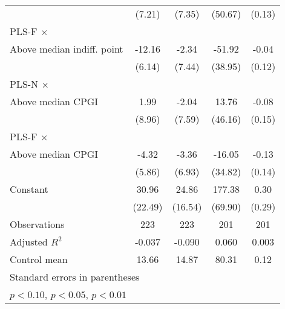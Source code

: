 \begin{table}[htbp]
\begin{tabular}{l*{4}{c}}
                &   (7.21)         &   (7.35)         &  (50.67)         &   (0.13)         \\
\addlinespace
PLS-F $\times$ \\ Above median indiff. point&   -12.16\sym{**} &    -2.34         &   -51.92         &    -0.04         \\
                &   (6.14)         &   (7.44)         &  (38.95)         &   (0.12)         \\
\addlinespace
PLS-N $\times$ \\ Above median CPGI&     1.99         &    -2.04         &    13.76         &    -0.08         \\
                &   (8.96)         &   (7.59)         &  (46.16)         &   (0.15)         \\
\addlinespace
PLS-F $\times$ \\ Above median CPGI&    -4.32         &    -3.36         &   -16.05         &    -0.13         \\
                &   (5.86)         &   (6.93)         &  (34.82)         &   (0.14)         \\
\addlinespace
Constant        &    30.96         &    24.86         &   177.38\sym{**} &     0.30         \\
                &  (22.49)         &  (16.54)         &  (69.90)         &   (0.29)         \\
\midrule
Observations    &      223         &      223         &      201         &      201         \\
Adjusted \(R^{2}\)&   -0.037         &   -0.090         &    0.060         &    0.003         \\
Control mean    &    13.66         &    14.87         &    80.31         &     0.12         \\
\bottomrule
\multicolumn{5}{l}{\footnotesize Standard errors in parentheses}\\
\multicolumn{5}{l}{\footnotesize \sym{*} \(p<0.10\), \sym{**} \(p<0.05\), \sym{***} \(p<0.01\)}\\
\end{tabular}
\end{table}

